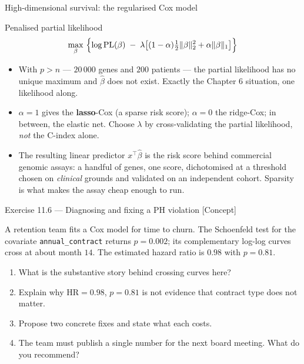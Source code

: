 \documentclass[aspectratio=169,11pt]{beamer}
\begin{document}
\begin{frame}{High-dimensional survival: the regularised Cox model}
  \footnotesize
  \begin{block}{Penalised partial likelihood}
    \[
      \max_{\beta}\ \Bigl\{\log \mathrm{PL}(\beta)
        \;-\;\lambda\bigl[(1-\alpha)\tfrac12\|\beta\|_2^2+\alpha\|\beta\|_1\bigr]\Bigr\}
    \]
  \end{block}
  \begin{readme}
    \begin{itemize}
      \item With $p>n$ --- $20\,000$ genes and $200$ patients --- the partial likelihood
            has no unique maximum and $\hat\beta$ does not exist. Exactly the Chapter 6
            situation, one likelihood along.
      \item $\alpha=1$ gives the \textbf{lasso}-Cox (a sparse risk score); $\alpha=0$ the
            ridge-Cox; in between, the elastic net. Choose $\lambda$ by cross-validating
            the partial likelihood, \emph{not} the C-index alone.
      \item The resulting linear predictor $x^\top\hat\beta$ is the risk score behind
            commercial genomic assays: a handful of genes, one score, dichotomised at a
            threshold chosen on \emph{clinical} grounds and validated on an independent
            cohort. Sparsity is what makes the assay cheap enough to run.
    \end{itemize}
  \end{readme}
\end{frame}

\begin{frame}{Exercise 11.6 --- Diagnosing and fixing a PH violation [Concept]}
\begin{exercise}
  A retention team fits a Cox model for time to churn. The Schoenfeld test for the
  covariate \texttt{annual\_contract} returns $p=0.002$; its complementary log-log curves
  cross at about month $14$. The estimated hazard ratio is $0.98$ with $p=0.81$.
  \begin{enumerate}
    \item What is the substantive story behind crossing curves here?
    \item Explain why $\mathrm{HR}=0.98$, $p=0.81$ is not evidence that contract type
          does not matter.
    \item Propose two concrete fixes and state what each costs.
    \item The team must publish a single number for the next board meeting. What do you
          recommend?
  \end{enumerate}
\end{exercise}
\end{frame}
\end{document}
